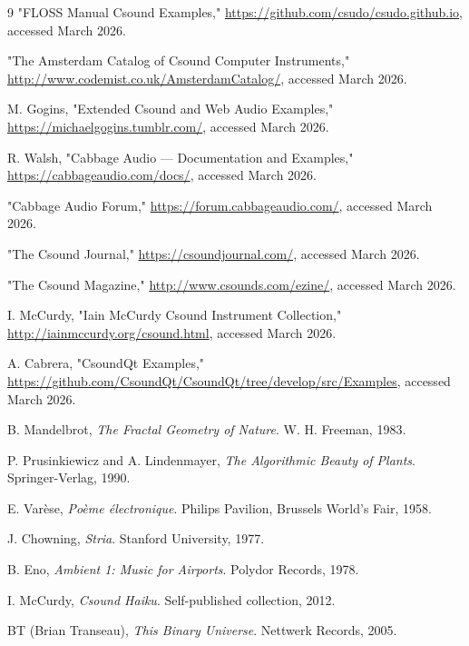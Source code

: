 \documentclass[a4paper]{article}
\begin{document}
\begin{thebibliography}{9}
"FLOSS Manual Csound Examples," \url{https://github.com/csudo/csudo.github.io}, accessed March 2026.

"The Amsterdam Catalog of Csound Computer Instruments," \url{http://www.codemist.co.uk/AmsterdamCatalog/}, accessed March 2026.

M. Gogins, "Extended Csound and Web Audio Examples," \url{https://michaelgogins.tumblr.com/}, accessed March 2026.

R. Walsh, "Cabbage Audio — Documentation and Examples," \url{https://cabbageaudio.com/docs/}, accessed March 2026.

"Cabbage Audio Forum," \url{https://forum.cabbageaudio.com/}, accessed March 2026.

"The Csound Journal," \url{https://csoundjournal.com/}, accessed March 2026.

"The Csound Magazine," \url{http://www.csounds.com/ezine/}, accessed March 2026.

I. McCurdy, "Iain McCurdy Csound Instrument Collection," \url{http://iainmccurdy.org/csound.html}, accessed March 2026.

A. Cabrera, "CsoundQt Examples," \url{https://github.com/CsoundQt/CsoundQt/tree/develop/src/Examples}, accessed March 2026.

B. Mandelbrot, \textit{The Fractal Geometry of Nature}. W. H. Freeman, 1983.

P. Prusinkiewicz and A. Lindenmayer, \textit{The Algorithmic Beauty of Plants}. Springer-Verlag, 1990.

E. Varèse, \textit{Poème électronique}. Philips Pavilion, Brussels World's Fair, 1958.

J. Chowning, \textit{Stria}. Stanford University, 1977.

B. Eno, \textit{Ambient 1: Music for Airports}. Polydor Records, 1978.

I. McCurdy, \textit{Csound Haiku}. Self-published collection, 2012.

BT (Brian Transeau), \textit{This Binary Universe}. Nettwerk Records, 2005.

\end{thebibliography}
\end{document}
